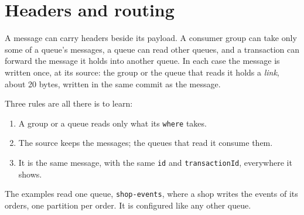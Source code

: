 %

\section{Headers and routing}

A message can carry headers beside its payload. A consumer group can take only some of a queue's
messages, a queue can read other queues, and a transaction can forward the message it holds into
another queue. In each case the message is written once, at its source: the group or the queue
that reads it holds a \emph{link}, about 20 bytes, written in the same commit as the message.

Three rules are all there is to learn:

\begin{enumerate}
\item A group or a queue reads only what its \texttt{where} takes.
\item The source keeps the messages; the queues that read it consume them.
\item It is the same message, with the same \texttt{id} and \texttt{transactionId}, everywhere it
shows.
\end{enumerate}


The examples read one queue, \texttt{shop-events}, where a shop writes the events of its orders,
one partition per order. It is configured like any other queue.

